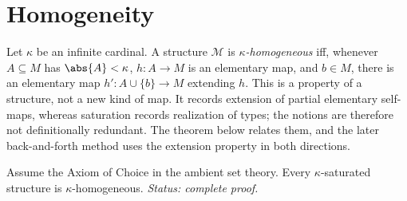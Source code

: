 \section{Homogeneity}
\label{sec:types-ultraproducts-02}
\label{sec:homogeneity}

\begin{definition}[Homogeneity]
\label{def:homogeneity}
Let \(\kappa\) be an infinite cardinal.  A structure \(\mathcal M\) is
\emph{\(\kappa\)-homogeneous} iff, whenever \(A\subseteq M\) has
\(\abs{A}<\kappa\), \(h:A\to M\) is an elementary map, and \(b\in M\),
there is an elementary map \(h':A\cup\{b\}\to M\) extending \(h\).  This is
a property of a structure, not a new kind of map.  It records extension of
partial elementary self-maps, whereas saturation records realization of
types; the notions are therefore not definitionally redundant.  The theorem
below relates them, and the later back-and-forth method uses the extension
property in both directions.
\end{definition}

\begin{theorem}
\label{thm:saturation-homogeneity}
Assume the Axiom of Choice in the ambient set theory.
Every \(\kappa\)-saturated structure is \(\kappa\)-homogeneous.
\textit{Status: complete proof.}
\end{theorem}

